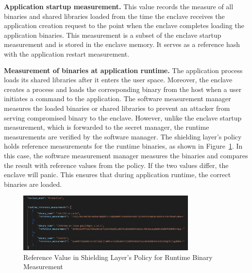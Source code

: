 \textbf{Application startup measurement.} This value records the measure of all binaries and shared libraries loaded from the time the enclave receives the application creation request to the point when the enclave completes loading the application binaries. 
This measurement is a subset of the enclave startup measurement and is stored in the enclave memory. It serves as a reference hash with the application restart measurement.

\textbf{Measurement of binaries at application runtime.} The application process loads its shared libraries after it enters the user space. Moreover, the enclave creates a process and loads the corresponding binary from the host when a user initiates a 
command to the application. The software measurement manager measures the loaded binaries or shared libraries to prevent an attacker from serving compromised binary to the enclave. However, unlike the enclave startup measurement, which is forwarded 
to the secret manager, the runtime measurements are verified by the software manager. The shielding layer's policy holds reference measurements for the runtime binaries, as shown in Figure~\ref{fig:measurement}. In this case, the software measurement manager measures 
the binaries and compares the result with reference values from the policy. If the two values differ, the enclave will panic. This ensures that during application runtime, the correct binaries are loaded.

\begin{figure}[H]
    \centering
    \includegraphics[width=0.8\textwidth]{images/measurement.png}
    \caption[Reference Value in Shielding Layer's Policy for Runtime Binary Measurement]{Reference Value in Shielding Layer's Policy for Runtime Binary Measurement}
    \label{fig:measurement}
\end{figure}

